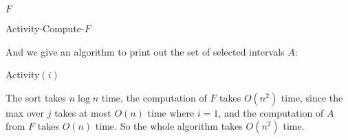 \documentclass[12pt,oneside,reqno]{amsart}
\makeatletter
\theoremstyle{plain}
\theoremstyle{definition}
\theoremstyle{remark}
\newcommand{\bb}{\vspace{3mm}}
\newenvironment{restoretext}%
    {\@parboxrestore%
     \begin{adjustwidth}{}{\leftmargin}%
    }{\end{adjustwidth}
     }
\makeatother
\begin{document}
\begin{enumerate}[label=\arabic*.]
\begin{restoretext}
\begin{algorithm}[H]
{
\Return $F$\;
}
\caption{Activity-Compute-$F$}
\end{algorithm}
\end{restoretext}
\bb
And we give an algorithm to print out the set of selected intervals $A$:

\begin{restoretext}
\begin{algorithm}[H]\label{alg2}
\caption{Activity$(i)$}
\end{algorithm}
\end{restoretext}

\bb

The sort takes $n \log n$ time, the computation of $F$ takes $O(n^2)$ time, since the max over $j$ takes at most $O(n)$ time where $i = 1$, and the computation of $A$ from $F$ takes $O(n)$ time. So the whole algorithm takes $O(n^2)$ time. 






















































































\end{enumerate}
\end{document}
